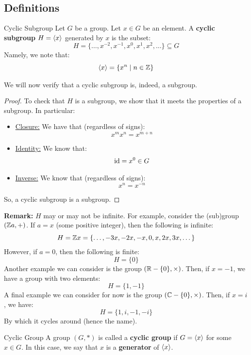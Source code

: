 \documentclass[letterpaper]{article}
\begin{document}
\subsection{Definitions}
\begin{definition}{Cyclic Subgroup}{}
    Let $G$ be a group. Let $x \in G$ be an element. A \textbf{cyclic subgroup} $H = \langle x \rangle$ generated by $x$ is the subset: 
    \[H = \{\dots, x^{-2}, x^{-1}, x^0, x^1, x^2, \dots\} \subseteq G\]
    Namely, we note that:
    \[\langle x \rangle = \{x^n \mid n \in \mathbb{Z}\}\]
\end{definition}
We will now verify that a cyclic subgroup is, indeed, a subgroup. 
\begin{mdframed}
    \begin{proof}
        To check that $H$ is a subgroup, we show that it meets the properties of a subgroup. In particular:
        \begin{itemize}
            \item \underline{Closure:} We have that (regardless of signs): 
            \[x^m x^n = x^{m + n}\]

            \item \underline{Identity:} We know that: 
            \[\operatorname{id} = x^0 \in G\]

            \item \underline{Inverse:} We know that (regardless of signs): 
            \[x^n = x^{-n}\]
        \end{itemize}
        So, a cyclic subgroup is a subgroup. 
    \end{proof}
\end{mdframed}

\textbf{Remark:} $H$ may or may not be infinite. For example, consider the (sub)group $(\mathbb{Z} a, +)$. If $a = x$ (some positive integer), then the following is infinite: 
\[H = \mathbb{Z} x = \{\dots, -3x, -2x, -x, 0, x, 2x, 3x, \dots\}\]
However, if $a = 0$, then the following is finite: 
\[H = \{0\}\] 
Another example we can consider is the group $(\mathbb{R} - \{0\}, \times)$. Then, if $x = -1$, we have a group with two elements: 
\[H = \{1, -1\}\]
A final example we can consider for now is the group $(\mathbb{C} - \{0\}, \times)$. Then, if $x = i$, we have: 
\[H = \{1, i, -1, -i\}\]
By which it cycles around (hence the name). 

\begin{definition}{Cyclic Group}{}
    A group $(G, *)$ is called a \textbf{cyclic group} if $G = \langle x \rangle$ for some $x \in G$. In this case, we say that $x$ is a \textbf{generator} of $\langle x \rangle$. 
\end{definition}
\end{document}
